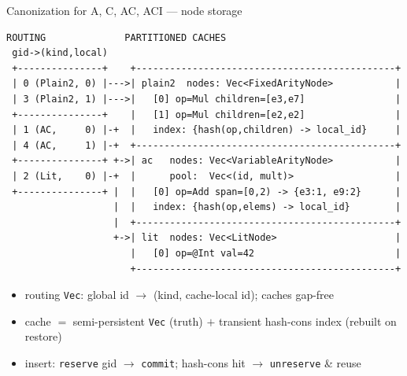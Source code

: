 \documentclass[aspectratio=169,10pt]{beamer}
\newcommand{\code}[1]{\texttt{\small #1}}
\begin{document}
\begin{frame}[fragile]{Canonization for A, C, AC, ACI --- node storage}
\begin{lstlisting}[basicstyle=\ttfamily\scriptsize]
 ROUTING              PARTITIONED CACHES
 gid->(kind,local)
 +---------------+    +----------------------------------------------+
 | 0 (Plain2, 0) |--->| plain2  nodes: Vec<FixedArityNode>           |
 | 3 (Plain2, 1) |--->|   [0] op=Mul children=[e3,e7]                |
 +---------------+    |   [1] op=Mul children=[e2,e2]                |
 | 1 (AC,     0) |-+  |   index: {hash(op,children) -> local_id}     |
 | 4 (AC,     1) |-+  +----------------------------------------------+
 +---------------+ +->| ac   nodes: Vec<VariableArityNode>           |
 | 2 (Lit,    0) |-+  |      pool:  Vec<(id, mult)>                  |
 +---------------+ |  |   [0] op=Add span=[0,2) -> {e3:1, e9:2}      |
                   |  |   index: {hash(op,elems) -> local_id}        |
                   |  +----------------------------------------------+
                   +->| lit  nodes: Vec<LitNode>                     |
                      |   [0] op=@Int val=42                         |
                      +----------------------------------------------+
\end{lstlisting}
\vspace{-1mm}
\begin{itemize}\small
  \item routing \code{Vec}: global id $\to$ \alert{(kind, cache-local id)}; caches gap-free
  \item cache $=$ semi-persistent \code{Vec} (truth) $+$ \alert{transient} hash-cons index (rebuilt on restore)
  \item insert: \code{reserve} gid $\to$ \code{commit}; hash-cons hit $\to$ \code{unreserve} \& reuse
\end{itemize}
\end{frame}
\end{document}
